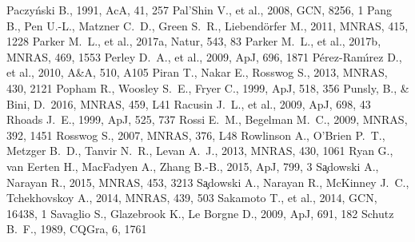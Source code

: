\documentclass[a4paper,fleqn,usenatbib]{mnras}
\begin{document}
\begin{thebibliography}{207}
 Paczy\'nski B., 1991, AcA, 41, 257
 Pal'Shin V., et al., 2008, GCN, 8256, 1
 Pang B., Pen U.-L., Matzner C.~D., Green S.~R., Liebend{\"o}rfer M., 2011, MNRAS, 415, 1228
 Parker M.~L., et al., 2017a, Natur, 543, 83
 Parker M.~L., et al., 2017b, MNRAS, 469, 1553
 Perley D.~A., et al., 2009, ApJ, 696, 1871
 P{\'e}rez-Ram{\'{\i}}rez D., et al., 2010, A\&A, 510, A105
 Piran T., Nakar E., Rosswog S., 2013, MNRAS, 430, 2121
 Popham R., Woosley S.~E., Fryer C., 1999, ApJ, 518, 356
 Punsly, B., \& Bini, D.\ 2016, MNRAS, 459, L41
 Racusin J.~L., et al., 2009, ApJ, 698, 43
 Rhoads J.~E., 1999, ApJ, 525, 737
 Rossi E.~M., Begelman M.~C., 2009, MNRAS, 392, 1451
 Rosswog S., 2007, MNRAS, 376, L48
 Rowlinson A., O'Brien P.~T., Metzger B.~D., Tanvir N.~R., Levan A.~J., 2013, MNRAS, 430, 1061
 Ryan G., van Eerten H., MacFadyen A., Zhang B.-B., 2015, ApJ, 799, 3
 S{\c a}dowski A., Narayan R., 2015, MNRAS, 453, 3213
 S{\c a}dowski A., Narayan R., McKinney J.~C., Tchekhovskoy A., 2014, MNRAS, 439, 503
 Sakamoto T., et al., 2014, GCN, 16438, 1
 Savaglio S., Glazebrook K., Le Borgne D., 2009, ApJ, 691, 182
 Schutz B.~F., 1989, CQGra, 6, 1761

\end{thebibliography}
\end{document}

